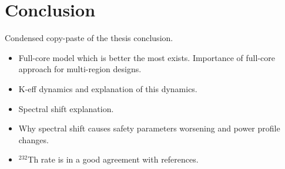 \section{Conclusion}

Condensed copy-paste of the thesis conclusion.
\begin{itemize}
    \item Full-core model which is better the most exists. Importance of full-core approach for multi-region designs.
    \item K-eff dynamics and explanation of this dynamics.
    \item Spectral shift explanation.
    \item Why spectral shift causes safety parameters worsening and power profile changes.
    \item $^{232}$Th rate is in a good agreement with references.
\end{itemize}

\FloatBarrier
